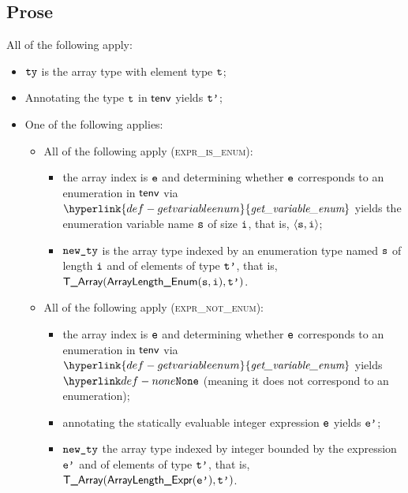 \documentclass{book}
\newcommand\ProseOrTypeError[0]{\ProseTerminateAs{\TypeErrorConfig}}
\newcommand\getvariableenum[0]{\hyperlink{def-getvariableenum}{\textfunc{get\_variable\_enum}}}
\begin{document}
\subsection{Prose}
All of the following apply:
\begin{itemize}
  \item $\texttt{ty}$ is the array type with element type $\texttt{t}$;
  \item Annotating the type $\texttt{t}$ in $\textsf{tenv}$ yields $\texttt{t'}$\ProseOrTypeError;
  \item One of the following applies:
  \begin{itemize}
    \item All of the following apply (\textsc{expr\_is\_enum}):
    \begin{itemize}
      \item the array index is $\texttt{e}$ and determining whether $\texttt{e}$ corresponds to an enumeration in $\textsf{tenv}$
      via $\getvariableenum$ yields the enumeration variable
      name $\texttt{s}$ of size $\texttt{i}$, that is, $\langle \texttt{s}, \texttt{i} \rangle$\ProseOrTypeError;
      \item $\texttt{new\_ty}$ is the array type indexed by an enumeration type
      named $\texttt{s}$ of length $\texttt{i}$ and of elements of type $\texttt{t'}$, that is, $\textsf{T\_Array}(\textsf{ArrayLength\_Enum}(\texttt{s}, \texttt{i}), \texttt{t'})$.
    \end{itemize}

    \item All of the following apply (\textsc{expr\_not\_enum}):
    \begin{itemize}
      \item the array index is $\texttt{e}$ and determining whether $\texttt{e}$ corresponds to an enumeration in $\textsf{tenv}$
      via $\getvariableenum$ yields $\None$ (meaning it does not
      correspond to an enumeration)\ProseOrTypeError;
      \item annotating the statically evaluable integer expression $\texttt{e}$ yields
      $\texttt{e'}$\ProseOrTypeError;
      \item $\texttt{new\_ty}$ the array type indexed by integer bounded by
      the expression $\texttt{e'}$ and of elements of type $\texttt{t'}$, that is,
      $\textsf{T\_Array}(\textsf{ArrayLength\_Expr}(\texttt{e'}), \texttt{t'})$.
    \end{itemize}


\end{itemize}
\end{itemize}
\end{document}
